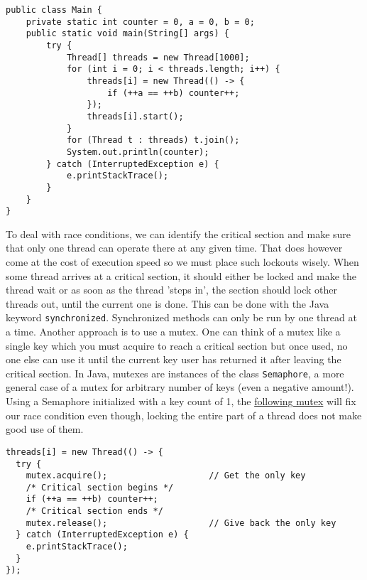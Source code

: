 \begin{lstlisting}[style=A_Java, caption={\href{https://github.com/JonSteinn/AndroidDevelopment/blob/master/examples/lab2/javathreads/3/Main.java}{Race condition}}, label={listing:rcon}]
public class Main {
    private static int counter = 0, a = 0, b = 0;
    public static void main(String[] args) {
        try {
            Thread[] threads = new Thread[1000];
            for (int i = 0; i < threads.length; i++) {
                threads[i] = new Thread(() -> {
                    if (++a == ++b) counter++;
                });
                threads[i].start();
            }
            for (Thread t : threads) t.join();
            System.out.println(counter);
        } catch (InterruptedException e) {
            e.printStackTrace();
        }
    }
}
\end{lstlisting}

To deal with race conditions, we can identify the critical section and make sure that only one thread can operate there at any given time. That does however come at the cost of execution speed so we must place such lockouts wisely. When some thread arrives at a critical section, it should either be locked and make the thread wait or as soon as the thread 'steps in', the section should lock other threads out, until the current one is done. This can be done with the Java keyword \verb!synchronized!. Synchronized methods can only be run by one thread at a time. Another approach is to use a mutex. One can think of a mutex like a single key which you must acquire to reach a critical section but once used, no one else can use it until the current key user has returned it after leaving the critical section. In Java, mutexes are instances of the class \texttt{Semaphore}, a more general case of a mutex for arbitrary number of keys (even a negative amount!). Using a Semaphore initialized with a key count of 1, the \href{https://github.com/JonSteinn/AndroidDevelopment/blob/master/examples/lab2/javathreads/4/Main.java}{following mutex} will fix our race condition even though, locking the entire part of a thread does not make good use of them.

\begin{lstlisting}[style=A_Java]
threads[i] = new Thread(() -> {
  try {
    mutex.acquire();                    // Get the only key
    /* Critical section begins */
    if (++a == ++b) counter++;
    /* Critical section ends */
    mutex.release();                    // Give back the only key
  } catch (InterruptedException e) {
    e.printStackTrace();
  }
});
\end{lstlisting}

